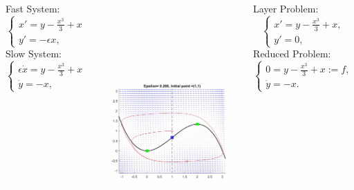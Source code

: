 \documentclass[15pt, a0paper, portrait]{tikzposter}
\begin{document}
\begin{columns}
{Fast System:
\begin{equation*}\label{fastsystem}
    \begin{cases} x'=y-\frac{x^3}{3}+x\\
    y'=-\epsilon x,
    \end{cases}
\end{equation*}
Slow System: 
\begin{equation*}\label{slowsystem}
    \begin{cases} \epsilon \dot{x}=y-\frac{x^3}{3}+x\\
    \dot{y}=-x,
    \end{cases}
\end{equation*}
}

%   
{
	 
	\begin{tikzfigure}[h!]
		\centering
		\includegraphics[height=10cm,width=13cm]{Posterpic1.jpg}
	\end{tikzfigure}
}
{
	Layer Problem:
	\begin{equation*}\label{fastsystem0}
	\begin{cases} x'=y-\frac{x^3}{3}+x,\\
	y'=0,
	\end{cases}
	\end{equation*}
	Reduced Problem:
	\begin{equation*}\label{slowsystem0}
	\begin{cases} 0=y-\frac{x^3}{3}+x:=f,\\
	\dot{y}=-x.
	\end{cases}
	\end{equation*}
	
}
\end{columns}
\end{document}
